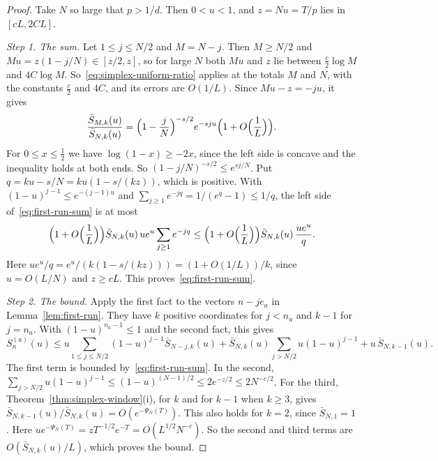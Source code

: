 \begin{proof}
Take $N$ so large that $p>1/d$. Then $0<u<1$, and $z=Nu=T/p$ lies in
$[cL,2CL]$.

\emph{Step 1. The sum.} Let $1\le j\le N/2$ and $M=N-j$. Then $M\ge N/2$ and
$Mu=z(1-j/N)\in[z/2,z]$, so for large $N$ both $Mu$ and $z$ lie between
$\frac c2\log M$ and $4C\log M$. So~\eqref{eq:simplex-uniform-ratio} applies at
the totals $M$ and $N$, with the constants $\frac c2$ and $4C$, and its errors
are $O(1/L)$. Since $Mu-z=-ju$, it gives
\[
 \frac{\bar S_{M,k}(u)}{\bar S_{N,k}(u)}
 =\Bigl(1-\frac jN\Bigr)^{-s/2}e^{-sju}\Bigl(1+O\Bigl(\frac1L\Bigr)\Bigr).
\]
For $0\le x\le\frac12$ we have $\log(1-x)\ge-2x$, since the left side is concave
and the inequality holds at both ends. So $(1-j/N)^{-s/2}\le e^{sj/N}$. Put
$q=ku-s/N=ku(1-s/(kz))$, which is positive. With $(1-u)^{j-1}\le e^{-(j-1)u}$
and $\sum_{j\ge1}e^{-jq}=1/(e^q-1)\le1/q$, the left side
of~\eqref{eq:first-run-sum} is at most
\[
 \Bigl(1+O\Bigl(\frac1L\Bigr)\Bigr)\bar S_{N,k}(u)\,ue^u\sum_{j\ge1}e^{-jq}
 \le\Bigl(1+O\Bigl(\frac1L\Bigr)\Bigr)\bar S_{N,k}(u)\,\frac{ue^u}q .
\]
Here $ue^u/q=e^u/(k(1-s/(kz)))=(1+O(1/L))/k$, since $u=O(L/N)$ and $z\ge cL$.
This proves~\eqref{eq:first-run-sum}.

\emph{Step 2. The bound.} Apply the first fact to the vectors $n-je_a$ in
Lemma~\ref{lem:first-run}. They have $k$ positive coordinates for $j<n_a$ and
$k-1$ for $j=n_a$. With $(1-u)^{n_a-1}\le1$ and the second fact, this gives
\[
 S^{(a)}_n(u)\le u\sum_{1\le j\le N/2}(1-u)^{j-1}\bar S_{N-j,k}(u)
 +\bar S_{N,k}(u)\sum_{j>N/2}u(1-u)^{j-1}+u\,\bar S_{N,k-1}(u).
\]
The first term is bounded by~\eqref{eq:first-run-sum}. In the second,
$\sum_{j>N/2}u(1-u)^{j-1}\le(1-u)^{(N-1)/2}\le2e^{-z/2}\le2N^{-c/2}$. For the
third, Theorem~\ref{thm:simplex-window}(i), for $k$ and for $k-1$ when $k\ge3$,
gives $\bar S_{N,k-1}(u)/\bar S_{N,k}(u)=O(e^{-\Psi_N(T)})$. This also holds for
$k=2$, since $\bar S_{N,1}=1$. Here $ue^{-\Psi_N(T)}=zT^{-1/2}e^{-T}
=O(L^{1/2}N^{-c})$. So the second and third terms are
$O(\bar S_{N,k}(u)/L)$, which proves the bound.
\end{proof}

